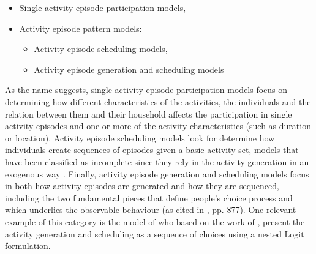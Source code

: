 \documentclass[Journal,letterpaper]{ascelike-new}
\begin{document}
\begin{itemize}
    \item Single activity episode participation models,
    \item Activity episode pattern models:
    \begin{itemize}
        \item Activity episode scheduling models,
        \item Activity episode generation and scheduling models
    \end{itemize}
\end{itemize}
As the name suggests, single activity episode participation models focus on determining how different characteristics of the activities, the individuals and the relation between them and their household affects the participation in single activity episodes and one or more of the activity characteristics (such as duration or location). Activity episode scheduling models look for determine how individuals create sequences of episodes given a basic activity set, models that have been classified as incomplete since they rely in the activity generation in an exogenous way \citep{bowman2009historical}. Finally, activity episode generation and scheduling models focus in both how activity episodes are generated and how they are sequenced, including the two fundamental pieces that define people's choice process and which underlies the observable behaviour (as cited in \cite{Scott2002875}, pp. 877). One relevant example of this category is the model of \cite{Bowman20011} who based on the work of \cite{Mosh-1996}, present the activity generation and scheduling as a sequence of choices using a nested Logit formulation.

\end{document}
